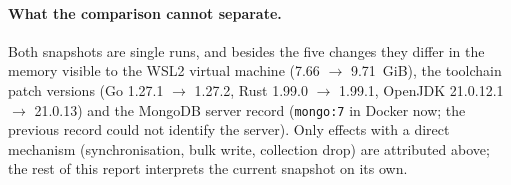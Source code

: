 \paragraph{What the comparison cannot separate.}
Both snapshots are single runs, and besides the five changes they differ in
the memory visible to the WSL2 virtual machine (7.66 $\to$ 9.71~GiB), the
toolchain patch versions (Go 1.27.1 $\to$ 1.27.2, Rust 1.99.0 $\to$ 1.99.1,
OpenJDK 21.0.12.1 $\to$ 21.0.13) and the MongoDB server record
(\texttt{mongo:7} in Docker now; the previous record could not identify the
server). Only effects with a direct mechanism (synchronisation, bulk write,
collection drop) are attributed above; the rest of this report interprets
the current snapshot on its own.
